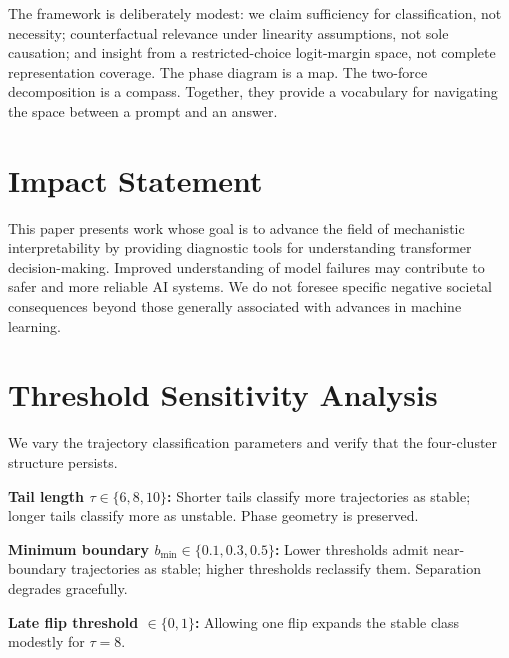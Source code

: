 \documentclass{article}
\begin{document}
The framework is deliberately modest: we claim sufficiency for classification, not necessity; counterfactual relevance under linearity assumptions, not sole causation; and insight from a restricted-choice logit-margin space, not complete representation coverage.  The phase diagram is a map.  The two-force decomposition is a compass.  Together, they provide a vocabulary for navigating the space between a prompt and an answer.


\section*{Impact Statement}

This paper presents work whose goal is to advance the field of mechanistic interpretability by providing diagnostic tools for understanding transformer decision-making.  Improved understanding of model failures may contribute to safer and more reliable AI systems.  We do not foresee specific negative societal consequences beyond those generally associated with advances in machine learning.


\balance




\clearpage
\appendix

\section{Threshold Sensitivity Analysis}
\label{sec:appendix_sensitivity}

We vary the trajectory classification parameters and verify that the four-cluster structure persists.

\textbf{Tail length $\tau \in \{6, 8, 10\}$:}  Shorter tails classify more trajectories as stable; longer tails classify more as unstable.  Phase geometry is preserved.

\textbf{Minimum boundary $b_{\min} \in \{0.1, 0.3, 0.5\}$:}  Lower thresholds admit near-boundary trajectories as stable; higher thresholds reclassify them.  Separation degrades gracefully.

\textbf{Late flip threshold $\in \{0, 1\}$:}  Allowing one flip expands the stable class modestly for $\tau = 8$.
\end{document}
